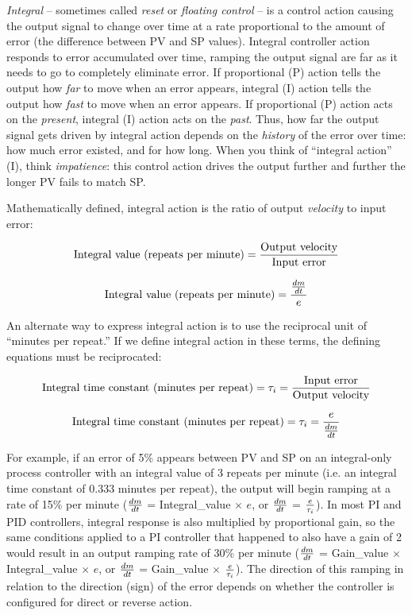 \textit{Integral} -- sometimes called \textit{reset} or \textit{floating control} -- is a control action causing the output signal to change over time at a rate proportional to the amount of error (the difference between PV and SP values).  Integral controller action responds to error accumulated over time, ramping the output signal are far as it needs to go to completely eliminate error.   If proportional (P) action tells the output how \textit{far} to move when an error appears, integral (I) action tells the output how \textit{fast} to move when an error appears.  If proportional (P) action acts on the \textit{present}, integral (I) action acts on the \textit{past}.  Thus, how far the output signal gets driven by integral action depends on the \textit{history} of the error over time: how much error existed, and for how long.  When you think of ``integral action'' (I), think \textit{impatience}: this control action drives the output further and further the longer PV fails to match SP.      

\vskip 10pt

Mathematically defined, integral action is the ratio of output \textit{velocity} to input error:   

$$\hbox{Integral value (repeats per minute)} = {\hbox{Output velocity} \over \hbox{Input error}}$$

$$\hbox{Integral value (repeats per minute)} = {{dm \over dt} \over e}$$

An alternate way to express integral action is to use the reciprocal unit of ``minutes per repeat.''  If we define integral action in these terms, the defining equations must be reciprocated:

$$\hbox{Integral time constant (minutes per repeat)} = \tau_i = {\hbox{Input error} \over \hbox{Output velocity}}$$

$$\hbox{Integral time constant (minutes per repeat)} = \tau_i = {e \over {dm \over dt}}$$

For example, if an error of 5\% appears between PV and SP on an integral-only process controller with an integral value of 3 repeats per minute (i.e. an integral time constant of 0.333 minutes per repeat), the output will begin ramping at a rate of 15\% per minute ($dm \over dt$ = Integral\_value $\times$ $e$, or $dm \over dt$ = $e \over \tau_i$).  In most PI and PID controllers, integral response is also multiplied by proportional gain, so the same conditions applied to a PI controller that happened to also have a gain of 2 would result in an output ramping rate of 30\% per minute ($dm \over dt$ = Gain\_value $\times$ Integral\_value $\times$ $e$, or $dm \over dt$ = Gain\_value $\times$ $e \over \tau_i$).  The direction of this ramping in relation to the direction (sign) of the error depends on whether the controller is configured for direct or reverse action.


